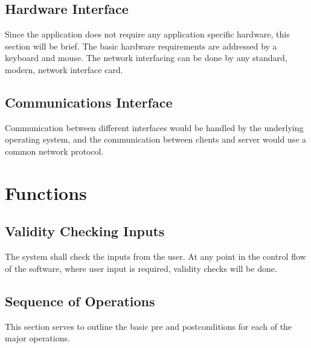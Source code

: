 \documentclass[12pt]{article}
\begin{document}
\subsection{Hardware Interface}

Since the application does not require any application specific hardware, this
section will be brief. The basic hardware requirements are addressed by a keyboard
and mouse.  The network interfacing can be done by any standard, modern, network
interface card.

\subsection{Communications Interface}

Communication between different interfaces would be handled by the underlying 
operating system, and the communication between clients and server would use 
a common network protocol.

\section{Functions}
\subsection{Validity Checking Inputs}


The system shall check the inputs from the user. At any point in the control flow
of the software, where user input is required, validity checks will be done.


\subsection{Sequence of Operations}

This section serves to outline the basic pre and postconditions for
each of the major operations.
\end{document}
